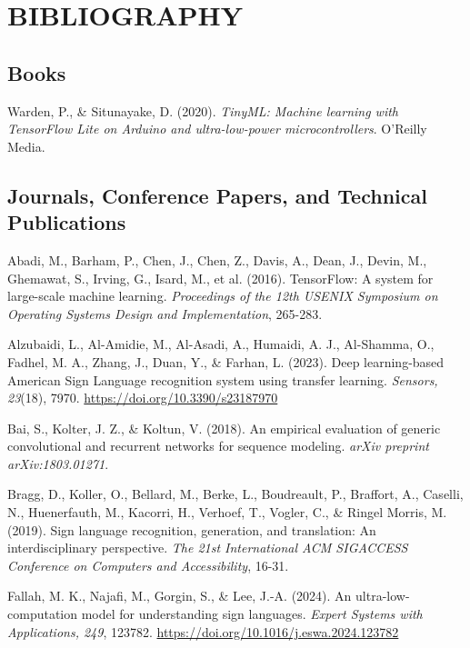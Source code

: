 
\chapter*{\uppercase{\textbf{BIBLIOGRAPHY}}}

\section*{Books}
\setlength{\parindent}{1.27cm}

\noindent Warden, P., \& Situnayake, D. (2020). \textit{TinyML: Machine learning with TensorFlow Lite on Arduino and ultra-low-power microcontrollers}. O'Reilly Media.

\section*{Journals, Conference Papers, and Technical Publications}

\noindent Abadi, M., Barham, P., Chen, J., Chen, Z., Davis, A., Dean, J., Devin, M., Ghemawat, S., Irving, G., Isard, M., et al. (2016). TensorFlow: A system for large-scale machine learning. \textit{Proceedings of the 12th USENIX Symposium on Operating Systems Design and Implementation}, 265-283.

\noindent Alzubaidi, L., Al-Amidie, M., Al-Asadi, A., Humaidi, A. J., Al-Shamma, O., Fadhel, M. A., Zhang, J., Duan, Y., \& Farhan, L. (2023). Deep learning-based American Sign Language recognition system using transfer learning. \textit{Sensors, 23}(18), 7970. \url{https://doi.org/10.3390/s23187970}

\noindent Bai, S., Kolter, J. Z., \& Koltun, V. (2018). An empirical evaluation of generic convolutional and recurrent networks for sequence modeling. \textit{arXiv preprint arXiv:1803.01271}.

\noindent Bragg, D., Koller, O., Bellard, M., Berke, L., Boudreault, P., Braffort, A., Caselli, N., Huenerfauth, M., Kacorri, H., Verhoef, T., Vogler, C., \& Ringel Morris, M. (2019). Sign language recognition, generation, and translation: An interdisciplinary perspective. \textit{The 21st International ACM SIGACCESS Conference on Computers and Accessibility}, 16-31.

\noindent Fallah, M. K., Najafi, M., Gorgin, S., \& Lee, J.-A. (2024). An ultra-low-computation model for understanding sign languages. \textit{Expert Systems with Applications, 249}, 123782. \url{https://doi.org/10.1016/j.eswa.2024.123782}

